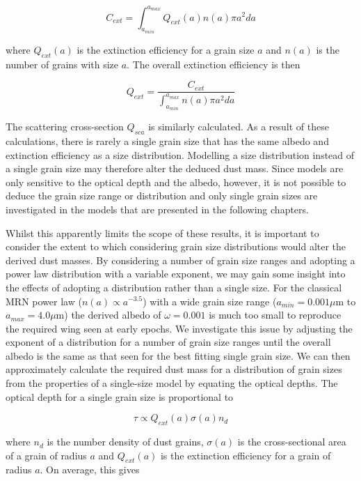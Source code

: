 \begin{equation}
C_{ext}=\int^{a_{max}}_{a_{min}} Q_{ext}(a) n(a) \pi a^2 da 
\end{equation}

where $Q_{ext}(a)$ is the extinction efficiency for a grain size $a$ and $n(a)$ is the number of grains with size $a$. The overall extinction efficiency is then

\begin{equation} 
Q_{ext} = \frac{C_{ext}}{ \int^{a_{max}}_{a_{min}} n(a) \pi a^2 da} 
\end{equation}
 
The scattering cross-section $Q_{sca}$ is similarly calculated.  As a result of these calculations, there is rarely a single grain size that has the same albedo and extinction efficiency as a size distribution.  Modelling a size distribution instead of a single grain size may therefore alter the deduced dust mass.  Since models are only sensitive to the optical depth and the albedo, however, it is not possible to deduce the grain size range or distribution and only single grain sizes are investigated in the models that are presented in the following chapters.

Whilst this apparently limits the scope of these results, it is important to consider the extent to which considering grain size distributions would alter the derived dust masses.  By considering a number of grain size ranges and adopting a power law distribution with a variable exponent, we may gain some insight into the effects of adopting a distribution rather than a single size.  For the classical MRN power law ($n(a) \propto a^{-3.5}$) with a wide grain size range ($a_{min} = 0.001 \mu$m to $a_{max} = 4.0 \mu$m) the derived albedo of $\omega=0.001$ is much too small to reproduce the required wing seen at early epochs.  We investigate this issue by adjusting the exponent of a distribution for a number of grain size ranges until the overall albedo is the same as that seen for the best fitting single grain size.  We can then approximately calculate the required dust mass for a distribution of grain sizes from the properties of a single-size model by equating the optical depths.  The optical depth for a single grain size is proportional to 

\begin{equation}
\tau \propto Q_{ext}(a)  \sigma(a) n_d
\end{equation}

\noindent where $n_d$ is the number density of dust grains, $\sigma(a)$ is the cross-sectional area of a grain of radius $a$ and $Q_{ext}(a)$ is the extinction efficiency for a grain of radius $a$.  On average, this gives

